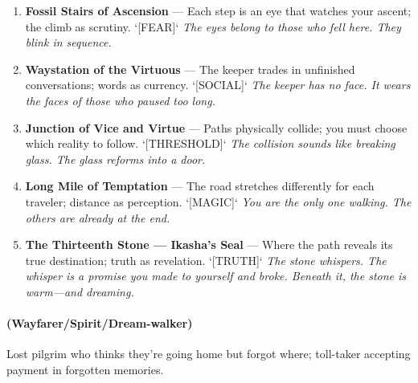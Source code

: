 \begin{enumerate}
  \hfill \textit{The thoughts are in a language you almost understand. One word is your name.}
\item \textbf{Fossil Stairs of Ascension} --- Each step is an eye that watches your ascent; the climb as scrutiny. `[FEAR]`
  \hfill \textit{The eyes belong to those who fell here. They blink in sequence.}
\item[J] \textbf{Waystation of the Virtuous} --- The keeper trades in unfinished conversations; words as currency. `[SOCIAL]`
  \hfill \textit{The keeper has no face. It wears the faces of those who paused too long.}
\item[Q] \textbf{Junction of Vice and Virtue} --- Paths physically collide; you must choose which reality to follow. `[THRESHOLD]`
  \hfill \textit{The collision sounds like breaking glass. The glass reforms into a door.}
\item[K] \textbf{Long Mile of Temptation} --- The road stretches differently for each traveler; distance as perception. `[MAGIC]`
  \hfill \textit{You are the only one walking. The others are already at the end.}
\item[A] \textbf{The Thirteenth Stone --- Ikasha's Seal} --- Where the path reveals its true destination; truth as revelation. `[TRUTH]`
  \hfill \textit{The stone whispers. The whisper is a promise you made to yourself and broke. Beneath it, the stone is warm---and dreaming.}
\end{enumerate}

\paragraph*{(Wayfarer/Spirit/Dream-walker)} Lost pilgrim who thinks they're going home but forgot where; toll-taker accepting payment in forgotten memories.


